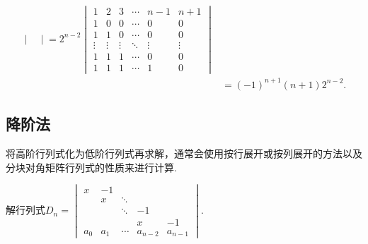 \begin{solution}
\begin{align*}
\begin{vmatrix}
               \end{vmatrix}=2^{n-2}
        \begin{vmatrix}
            1      & 2      & 3      & \cdots & n-1    & n+1    \\
            1      & 0      & 0      & \cdots & 0      & 0      \\
            1      & 1      & 0      & \cdots & 0      & 0      \\
            \vdots & \vdots & \vdots & \ddots & \vdots & \vdots \\
            1      & 1      & 1      & \cdots & 0      & 0      \\
            1      & 1      & 1      & \cdots & 1      & 0
        \end{vmatrix}                      \\
            & =(-1)^{n+1}(n+1) 2^{n-2}.
    \end{align*}
\end{solution}

\subsection{降阶法}

将高阶行列式化为低阶行列式再求解，通常会使用按行展开或按列展开的方法以及分块对角矩阵行列式的性质来进行计算.

\begin{example}{}{}
    解行列式$D_n=\begin{vmatrix}
            x     & -1    &        &         &         \\
                  & x     & \ddots &         &         \\
                  &       & \ddots & -1      &         \\
                  &       &        & x       & -1      \\
            a_{0} & a_{1} & \cdots & a_{n-2} & a_{n-1}
        \end{vmatrix}$.
\end{example}


